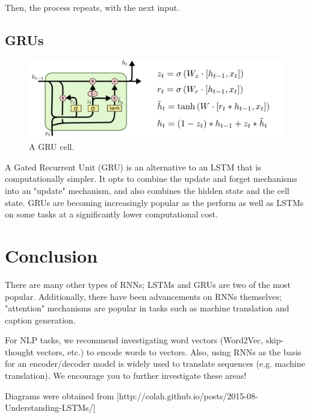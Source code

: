 \documentclass{article}
\begin{document}
    Then, the process repeats, with the next input.
    \subsection{GRUs}
        
        \begin{figure}[H]
            \centerline{\includegraphics[scale=0.4]{GRU.png}}
            \caption{A GRU cell.}
            \label{fig:gru}
        \end{figure}
        A Gated Recurrent Unit (GRU) is an alternative to an LSTM that is computationally simpler. It opts to combine the update and forget mechanisms into an "update" mechanism, and also combines the hidden state and the cell state. GRUs are becoming increasingly popular as the perform as well as LSTMs on some tasks at a significantly lower computational cost.

\section{Conclusion}
    There are many other types of RNNs; LSTMs and GRUs are two of the most popular. Additionally, there have been advancements on RNNs themselves; "attention" mechanisms are popular in tasks such as machine translation and caption generation. 
    
    For NLP tasks, we recommend investigating word vectors (Word2Vec, skip-thought vectors, etc.) to encode words to vectors. Also, using RNNs as the basis for an encoder/decoder model is widely used to translate sequences (e.g. machine translation). We encourage you to further investigate these areas!
    
    Diagrams were obtained from [http://colah.github.io/posts/2015-08-Understanding-LSTMs/]
\end{document}
